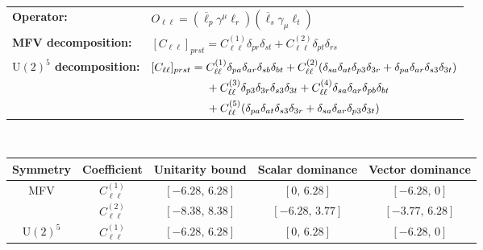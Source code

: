 \begin{table}[tbp]
\centering
{\small
\begin{tabular}{ll}
    \textbf{Operator:} & $\boxed{O_{\ell\ell} = (\overline\ell_p \gamma^\mu \ell_r)(\overline\ell_s \gamma_\mu \ell_t)}$ \\[0.2cm]
    \textbf{MFV decomposition:} &
        $[C_{\ell\ell}]_{prst} = C_{\ell\ell}^{(1)}\delta_{pr}\delta_{st} + C_{\ell\ell}^{(2)}\delta_{pt}\delta_{rs}$ \\[0.15cm]
    \textbf{$\mathrm{U}(2)^5$ decomposition:} &
        $[C_{\ell\ell}]_{prst} =
            C_{\ell\ell}^{(1)}\Pij{p}{r}{a}\Pij{s}{t}{b}
            + C_{\ell\ell}^{(2)}(\Pij{s}{t}{a}\delta_{p3}\delta_{3r} + \Pij{p}{r}{a}\delta_{s3}\delta_{3t})$ \\
        & $\phantom{[C_{\ell\ell}]_{prst} ={}}
            + C_{\ell\ell}^{(3)}\delta_{p3}\delta_{3r}\delta_{s3}\delta_{3t}
            + C_{\ell\ell}^{(4)}\Pij{s}{r}{a}\Pij{p}{t}{b}
            $ \\
        & $\phantom{[C_{\ell\ell}]_{prst} ={}}+ C_{\ell\ell}^{(5)}(\Pij{p}{t}{a}\delta_{s3}\delta_{3r} + \Pij{s}{r}{a}\delta_{p3}\delta_{3t})$ \\
\end{tabular}
\\[0.3cm]
\renewcommand{\arraystretch}{1.3}
\begin{tabular}{ccccc}
    \toprule
    \rowcolor{hdrcolor}
    \textbf{Symmetry} & \textbf{Coefficient}
        & \textbf{Unitarity bound}
        & \textbf{Scalar dominance}
        & \textbf{Vector dominance} \\
    \midrule
    \multirow{2}{*}{MFV}
        & $C_{\ell\ell}^{(1)}$ & $[-6.28,\, 6.28]$ & $[0,\, 6.28]$      & $[-6.28,\, 0]$    \\
        & $C_{\ell\ell}^{(2)}$ & $[-8.38,\, 8.38]$ & $[-6.28,\, 3.77]$  & $[-3.77,\, 6.28]$ \\
    \midrule
    \multirow{5}{*}{$\mathrm{U}(2)^5$}
        & $C_{\ell\ell}^{(1)}$ & $[-6.28,\, 6.28]$ & $[0,\, 6.28]$     & $[-6.28,\, 0]$    \\

\end{tabular}}
\end{table}
